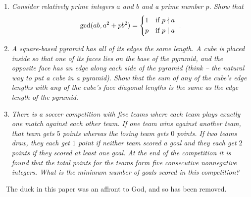 \documentclass{article}
\begin{document}
\begin{enumerate}[1.]
\item %
{\itshape Consider relatively prime integers $a$ and $b$ and a prime number $p$.
Show that
\[ \gcd(ab, a^2+pb^2) = \begin{cases*} 1 & if $p \nmid a$ \\ p & if $p \mid a$ \end{cases*}. \]}


\item %
{\itshape A square-based pyramid has all of its edges the same length.
A cube is placed inside so that one of its faces lies on the base of the pyramid, and the opposite face has an edge along each side of the pyramid (think -- the natural way to put a cube in a pyramid).
Show that the sum of any of the cube's edge lengths with any of the cube's face diagonal lengths is the same as the edge length of the pyramid.}


\item %
{\itshape There is a soccer competition with five teams where each team plays exactly one match against each other team.
If one team wins against another team, that team gets $5$ points whereas the losing team gets $0$ points.
If two teams draw, they each get $1$ point if neither team scored a goal and they each get $2$ points if they scored at least one goal.
At the end of the competition it is found that the total points for the teams form five consecutive nonnegative integers.
What is the minimum number of goals scored in this competition?}

\end{enumerate}


\clearpage
~
\vfill
\centering
The duck in this paper was an affront to God, and so has been removed.
\vfill
\end{document}
